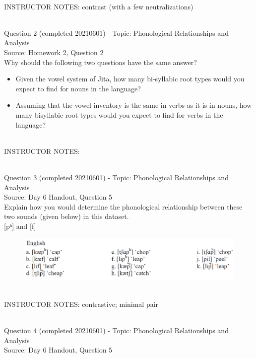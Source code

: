 \documentclass[12pt]{article}
\begin{document}
~\\
INSTRUCTOR NOTES: contrast (with a few neutralizations)


~\\

{\large Question 2} (completed 20210601) - Topic: Phonological Relationships and Analysis\\
Source: Homework 2, Question 2\\

Why should the following two questions have the same answer?\\

\begin{itemize} \item Given the vowel system of Jita, how many bi-syllabic root types would you expect to find for nouns in the language? \item Assuming that the vowel inventory is the same in verbs as it is in nouns, how many bisyllabic root types would you expect to find for verbs in the language? \end{itemize}


~\\
INSTRUCTOR NOTES: 


~\\

{\large Question 3} (completed 20210601) - Topic: Phonological Relationships and Analysis\\
Source: Day 6 Handout, Question 5\\

Explain how you would determine the phonological relationship between these two sounds (given below) in this dataset.\\

{[pʰ]} and {[f]}

\begin{figure}[H]
\includegraphics{../images/english_labials.png}
\end{figure}

~\\
INSTRUCTOR NOTES: contrastive; minimal pair


~\\

{\large Question 4} (completed 20210601) - Topic: Phonological Relationships and Analysis\\
Source: Day 6 Handout, Question 5\\
\end{document}
